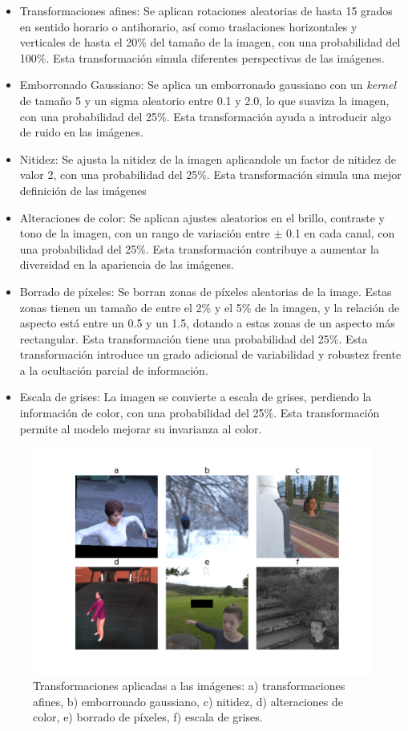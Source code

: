 \begin{itemize}
	\item Transformaciones afines: Se aplican rotaciones aleatorias de hasta 15 grados en sentido horario o antihorario, así como traslaciones horizontales y verticales de hasta el 20\% del tamaño de la imagen, con una probabilidad del 100\%. Esta transformación simula diferentes perspectivas de las imágenes.
	\item Emborronado Gaussiano: Se aplica un emborronado gaussiano con un \textit{kernel} de tamaño 5 y un sigma aleatorio entre 0.1 y 2.0, lo que suaviza la imagen, con una probabilidad del 25\%. Esta transformación ayuda a introducir algo de ruido en las imágenes.
	\item Nitidez: Se ajusta la nitidez de la imagen aplicandole un factor de nitidez de valor 2, con una probabilidad del 25\%. Esta transformación simula una mejor definición de las imágenes
	\item Alteraciones de color: Se aplican ajustes aleatorios en el brillo, contraste y tono de la imagen, con un rango de variación entre $\pm$ 0.1 en cada canal, con una probabilidad del 25\%. Esta transformación contribuye a aumentar la diversidad en la apariencia de las imágenes.
	\item Borrado de píxeles: Se borran zonas de píxeles aleatorias de la image. Estas zonas tienen un tamaño de entre el 2\% y el 5\% de la imagen, y la relación de aspecto está entre un 0.5 y un 1.5, dotando a estas zonas de un aspecto más rectangular. Esta transformación tiene una probabilidad del 25\%. Esta transformación introduce un grado adicional de variabilidad y robustez frente a la ocultación parcial de información.
	\item Escala de grises: La imagen se convierte a escala de grises, perdiendo la información de color, con una probabilidad del 25\%. Esta transformación permite al modelo mejorar su invarianza al color.
\end{itemize}

\begin{figure}[h]
	\centering
	\includegraphics[scale=0.4]{imagenes/cap4/augmented_images.png}
	\caption[Transformaciones utilizadas en el aumento de datos.]{Transformaciones aplicadas a las imágenes: a) transformaciones afines, b) emborronado gaussiano, c) nitidez, d) alteraciones de color, e) borrado de píxeles, f) escala de grises.}
	\label{fig25}
\end{figure}

